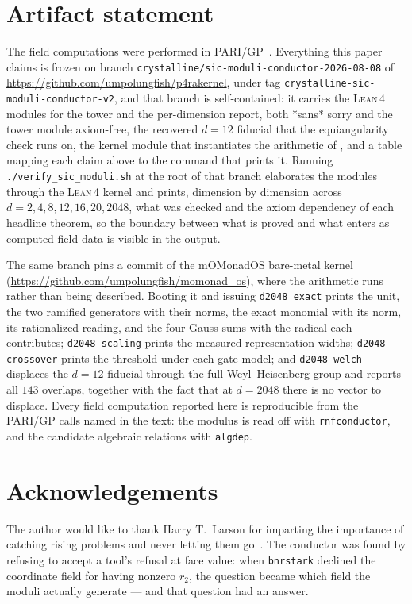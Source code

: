 \documentclass[12pt,a4paper]{article}
\newcommand{\Lean}{\textsc{Lean\,4}}
\begin{document}
\section*{Artifact statement}
The field computations were performed in PARI/GP~\cite{PARI}. Everything this
paper claims is frozen on branch \texttt{crystalline/sic-moduli-conductor-2026-08-08}
of \url{https://github.com/umpolungfish/p4rakernel}, under tag
\texttt{crystalline-sic-moduli-conductor-v2}, and that branch is self-contained:
it carries the \Lean{} modules for the tower and the per-dimension report, both
*sans* sorry and the tower module axiom-free, the recovered $d=12$ fiducial that
the equiangularity check runs on, the kernel module that instantiates the
arithmetic of , and a table mapping each claim above to the
command that prints it. Running \texttt{./verify\_sic\_moduli.sh} at the root of
that branch elaborates the modules through the \Lean{} kernel and prints,
dimension by dimension across $d = 2, 4, 8, 12, 16, 20, 2048$, what was checked
and the axiom dependency of each headline theorem, so the boundary between what
is proved and what enters as computed field data is visible in the output.

The same branch pins a commit of the mOMonadOS bare-metal kernel
(\url{https://github.com/umpolungfish/momonad_os}), where the arithmetic runs
rather than being described. Booting it and issuing \texttt{d2048 exact} prints
the unit, the two ramified generators with their norms, the exact monomial with
its norm, its rationalized reading, and the four Gauss sums with the radical
each contributes; \texttt{d2048 scaling} prints the measured representation
widths; \texttt{d2048 crossover} prints the threshold under each gate model; and
\texttt{d2048 welch} displaces the $d=12$ fiducial through the full
Weyl--Heisenberg group and reports all $143$ overlaps, together with the fact
that at $d=2048$ there is no vector to displace. Every field computation
reported here is reproducible from the PARI/GP calls named in the text: the
modulus is read off with \texttt{rnfconductor}, and the candidate algebraic
relations with \texttt{algdep}.

\section*{Acknowledgements}
The author would like to thank Harry T.\ Larson for imparting the importance of catching rising problems and never letting them go~\cite{Larson1961}. The conductor was found by refusing to accept a tool's refusal at face value: when \texttt{bnrstark} declined the coordinate field for having nonzero $r_2$, the question became which field the moduli actually generate — and that question had an answer.
\end{document}
